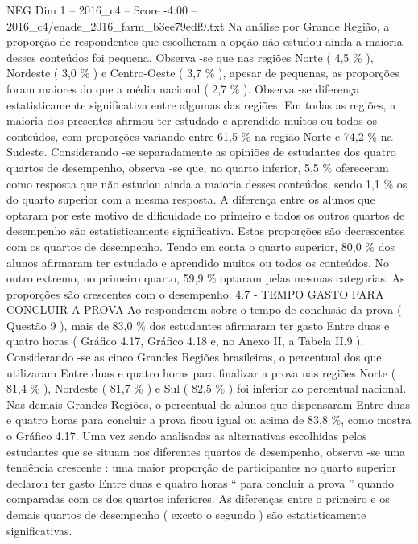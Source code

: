 \begin{textsample}{NEG Dim 1 – 2016\_c4 – Score -4.00 – 2016\_c4/enade\_2016\_farm\_b3ee79edf9.txt}
Na análise por Grande Região, a proporção de respondentes que escolheram a opção não estudou ainda a maioria desses conteúdos foi pequena.
Observa -se que nas regiões Norte ( 4,5 \% ), Nordeste ( 3,0 \% ) e Centro-Oeste ( 3,7 \% ), apesar de pequenas, as proporções foram maiores do que a média nacional ( 2,7 \% ).
Observa -se diferença estatisticamente significativa entre algumas das regiões.
Em todas as regiões, a maioria dos presentes afirmou ter estudado e aprendido muitos ou todos os conteúdos, com proporções variando entre 61,5 \% na região Norte e 74,2 \% na Sudeste.
Considerando -se separadamente as opiniões de estudantes dos quatro quartos de desempenho, observa -se que, no quarto inferior, 5,5 \% ofereceram como resposta que não estudou ainda a maioria desses conteúdos, sendo 1,1 \% os do quarto superior com a mesma resposta.
A diferença entre os alunos que optaram por este motivo de dificuldade no primeiro e todos os outros quartos de desempenho são estatisticamente significativa.
Estas proporções são decrescentes com os quartos de desempenho.
Tendo em conta o quarto superior, 80,0 \% dos alunos afirmaram ter estudado e aprendido muitos ou todos os conteúdos.
No outro extremo, no primeiro quarto, 59,9 \% optaram pelas mesmas categorias.
As proporções são crescentes com o desempenho. 4.7 - TEMPO GASTO PARA CONCLUIR A PROVA Ao responderem sobre o tempo de conclusão da prova ( Questão 9 ), mais de 83,0 \% dos estudantes afirmaram ter gasto Entre duas e quatro horas ( Gráfico 4.17, Gráfico 4.18 e, no Anexo II, a Tabela II.9 ).
Considerando -se as cinco Grandes Regiões brasileiras, o percentual dos que utilizaram Entre duas e quatro horas para finalizar a prova nas regiões Norte ( 81,4 \% ), Nordeste ( 81,7 \% ) e Sul ( 82,5 \% ) foi inferior ao percentual nacional.
Nas demais Grandes Regiões, o percentual de alunos que dispensaram Entre duas e quatro horas para concluir a prova ficou igual ou acima de 83,8 \%, como mostra o Gráfico 4.17.
Uma vez sendo analisadas as alternativas escolhidas pelos estudantes que se situam nos diferentes quartos de desempenho, observa -se uma tendência crescente : uma maior proporção de participantes no quarto superior declarou ter gasto Entre duas e quatro horas “ para concluir a prova ” quando comparadas com os dos quartos inferiores.
As diferenças entre o primeiro e os demais quartos de desempenho ( exceto o segundo ) são estatisticamente significativas.

\end{textsample}
